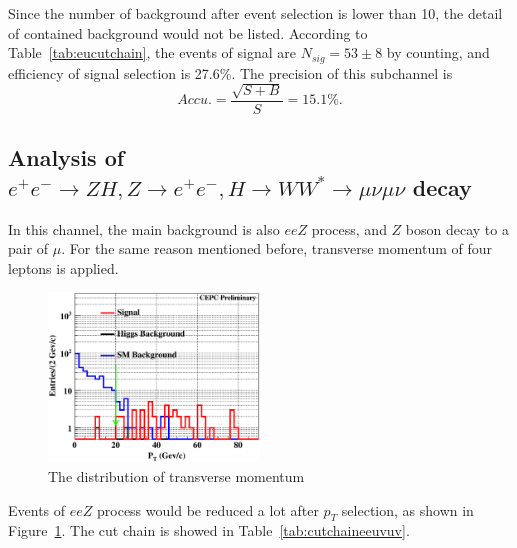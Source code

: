 \documentclass[11pt,a4paper]{cepcnote}
\begin{document}
Since the number of background after event selection is lower than 10, the detail of contained background would not be listed. 
According to Table~\ref{tab:eucutchain}, the events of signal are $N_{sig} = 53\pm 8$ by counting, and efficiency of signal 
selection is 27.6\%. The precision of this subchannel is 
\begin{equation*}
	Accu. = \frac{\sqrt{S+B}}{S} = 15.1\%.
\end{equation*}

\subsection{Analysis of $e^+e^- \to ZH, Z \to e^+e^-, H\to WW^* \to \mu\nu \mu\nu$ decay}
In this channel, the main background is also $eeZ$ process, and $Z$ boson decay to a pair of $\mu$. 
For the same reason mentioned before, transverse momentum of four leptons is applied.
\begin{figure}[H]
	\centering
	\includegraphics[width=0.5\textwidth]{e1e1H/uvuv/ptineeuvuv}
	\caption[]{The distribution of transverse momentum}
	\label{fig:ptineeuvuv}
\end{figure}
Events of $eeZ$ process would be reduced a lot after $p_T$ selection, as shown in Figure~\ref{fig:ptineeuvuv}. 
The cut chain is showed in Table~\ref{tab:cutchaineeuvuv}.
\end{document}
